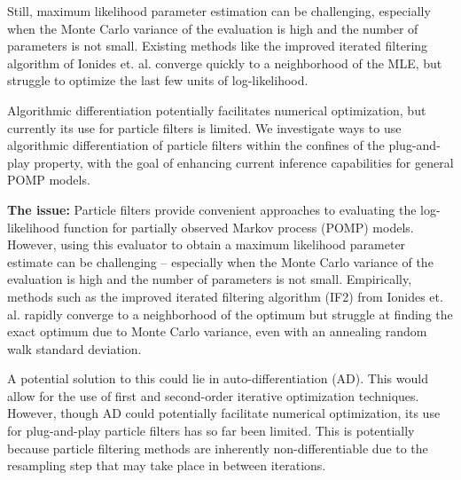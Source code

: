 \documentclass[9pt,twocolumn,twoside]{pnas-new}
\begin{document}
Still, maximum likelihood parameter estimation can be challenging, especially when the Monte Carlo variance of the evaluation is high and the number of parameters is not small. Existing methods like the improved iterated filtering algorithm of Ionides et. al. \cite{ionides15} converge quickly to a neighborhood of the MLE, but struggle to optimize the last few units of log-likelihood. 








Algorithmic differentiation potentially facilitates numerical optimization, but currently its use for particle filters is limited. We investigate ways to use algorithmic differentiation of particle filters within the confines of the plug-and-play property, with the goal of enhancing current inference capabilities for general POMP models.


\textbf{The issue:} Particle filters provide convenient approaches to evaluating the log-likelihood function for partially observed Markov process (POMP) models. However, using this evaluator to obtain a maximum likelihood parameter estimate can be challenging -- especially when the Monte Carlo variance of the evaluation is high and the number of parameters is not small. Empirically, methods such as the improved iterated filtering algorithm (IF2) from Ionides et. al. \cite{ionides15} rapidly converge to a neighborhood of the optimum but struggle at finding the exact optimum due to Monte Carlo variance, even with an annealing random walk standard deviation. 

A potential solution to this could lie in auto-differentiation (AD). This would allow for the use of first and second-order iterative optimization techniques. However, though AD could potentially facilitate numerical optimization, its use for plug-and-play particle filters has so far been limited. This is potentially because particle filtering methods are inherently non-differentiable due to the resampling step that may take place in between iterations. 
\end{document}
